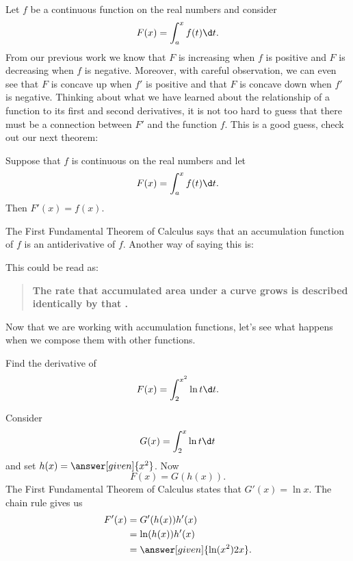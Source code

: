 \documentclass{ximera}
\begin{document}
Let $f$ be a continuous function on the real numbers and consider
\[
  F(x) = \int_a^x f(t)\d t.
\]
From our previous work we know that $F$ is increasing when $f$ is
positive and $F$ is decreasing when $f$ is negative. Moreover, with
careful observation, we can even see that $F$ is concave up when $f'$
is positive and that $F$ is concave down when $f'$ is negative.
Thinking about what we have learned about the relationship of a
function to its first and second derivatives, it is not too hard to
guess that there must be a connection between $F'$ and the function
$f$. This is a good guess, check out our next theorem:


\begin{theorem}
Suppose that $f$ is continuous on the real numbers and let
\[
  F(x)=\int_a^x f(t)\d t.
\]
Then $F'(x)=f(x)$.
\end{theorem}
The First Fundamental Theorem of Calculus says that an accumulation
function of $f$ is an antiderivative of $f$. Another way of saying
this is:
\begin{image}
\end{image}
This could be read as:%
\begin{quote}\large\textbf{The \textcolor{blue!70!green}{rate} that \textcolor{green!70!black!70!blue}{accumulated area} under a  \textcolor{purple!50!blue!90!black}{curve} grows is described identically by that  \color{purple!50!blue!90!black}{curve}.}
\end{quote}

Now that we are working with accumulation functions, let's see what
happens when we compose them with other functions.

\begin{example}
  Find the derivative of
  \[
  F(x) = \int_2^{x^2} \ln t \d t.
  \]
  \begin{explanation}
    Consider 
    \[
    G(x) = \int_2^x \ln t \d t
    \]
    and set $h(x) = \answer[given]{x^2}$. Now
    \[
    F(x) = G(h(x)).
    \]
    The First Fundamental Theorem of Calculus states that $G'(x) = \ln
    x$. The chain rule gives us
    \begin{align*}
      F'(x) &= G'(h(x)) h'(x) \\
      &= \ln (h(x)) h'(x) \\
      &= \answer[given]{\ln (x^2) 2x}.
    \end{align*}
  \end{explanation}
\end{example}
\end{document}
